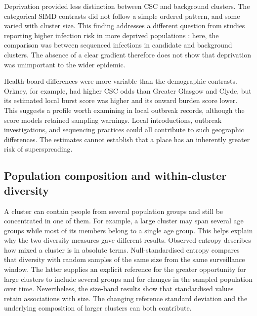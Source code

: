Deprivation provided less distinction between CSC and background clusters. The categorical SIMD contrasts did not follow a simple ordered pattern, and some varied with cluster size. This finding addresses a different question from studies reporting higher infection risk in more deprived populations \citep{Niedzwiedz2020}: here, the comparison was between sequenced infections in candidate and background clusters. The absence of a clear gradient therefore does not show that deprivation was unimportant to the wider epidemic.

Health-board differences were more variable than the demographic contrasts. Orkney, for example, had higher CSC odds than Greater Glasgow and Clyde, but its estimated local burst score was higher and its onward burden score lower. This suggests a profile worth examining in local outbreak records, although the score models retained sampling warnings. Local introductions, outbreak investigations, and sequencing practices could all contribute to such geographic differences. The estimates cannot establish that a place has an inherently greater risk of superspreading.

\subsection{Population composition and within-cluster diversity}\label{sec:ch6_discussion_mixing}

A cluster can contain people from several population groups and still be concentrated in one of them. For example, a large cluster may span several age groups while most of its members belong to a single age group. This helps explain why the two diversity measures gave different results. Observed entropy describes how mixed a cluster is in absolute terms. Null-standardised entropy compares that diversity with random samples of the same size from the same surveillance window. The latter supplies an explicit reference for the greater opportunity for large clusters to include several groups and for changes in the sampled population over time. Nevertheless, the size-band results show that standardised values retain associations with size. The changing reference standard deviation and the underlying composition of larger clusters can both contribute.

